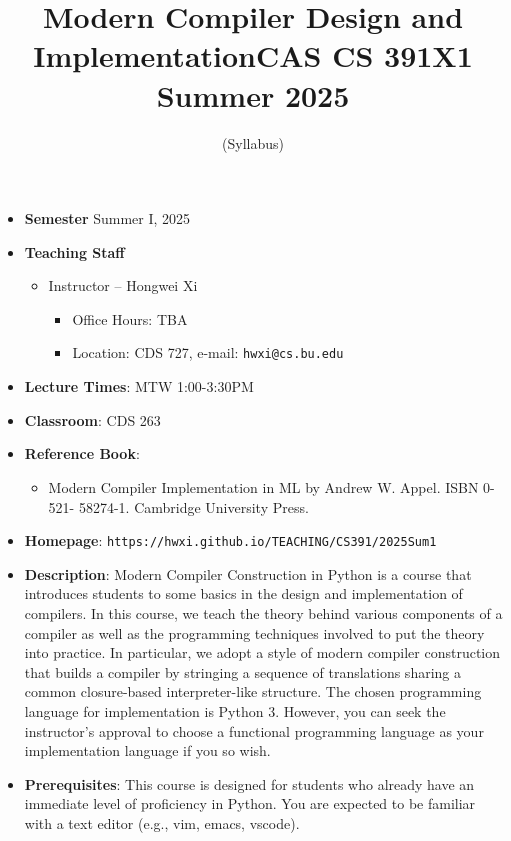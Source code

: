 \documentclass[11pt]{article}
\title{Modern Compiler Design and Implementation\break CAS CS 391X1 Summer 2025}
\author{(Syllabus)}
\date{}
\begin{document}
\maketitle
\thispagestyle{empty}

\begin{itemize}
\item
{\bf Semester}
Summer I, 2025
\item
{\bf Teaching Staff}
\begin{itemize}
\item
Instructor -- Hongwei Xi
\begin{itemize}
\item
Office Hours: TBA
\item
Location: CDS 727, e-mail: \texttt{hwxi@cs.bu.edu}
\end{itemize}
\end{itemize}

\item {\bf Lecture Times}: MTW 1:00-3:30PM
\item {\bf Classroom}: CDS 263
\item {\bf Reference Book}:\kern6pt
\begin{itemize}
\item
Modern Compiler Implementation in ML by Andrew W. Appel. ISBN 0-521-
58274-1. Cambridge University Press.
\end{itemize}

\item {\bf Homepage}:
{\tt  https://hwxi.github.io/TEACHING/CS391/2025Sum1}

\item {\bf Description}:
Modern Compiler Construction in Python is a course that introduces
students to some basics in the design and implementation of
compilers. In this course, we teach the theory behind various
components of a compiler as well as the programming techniques
involved to put the theory into practice. In particular, we adopt a
style of modern compiler construction that builds a compiler by
stringing a sequence of translations sharing a common closure-based
interpreter-like structure.  The chosen programming language for
implementation is Python 3. However, you can seek the instructor’s
approval to choose a functional programming language as your
implementation language if you so wish.

\item {\bf Prerequisites}:
This course is designed for students who already have an immediate
level of proficiency in Python. You are expected to be familiar with a
text editor (e.g., vim, emacs, vscode).


\end{itemize}
\end{document}
